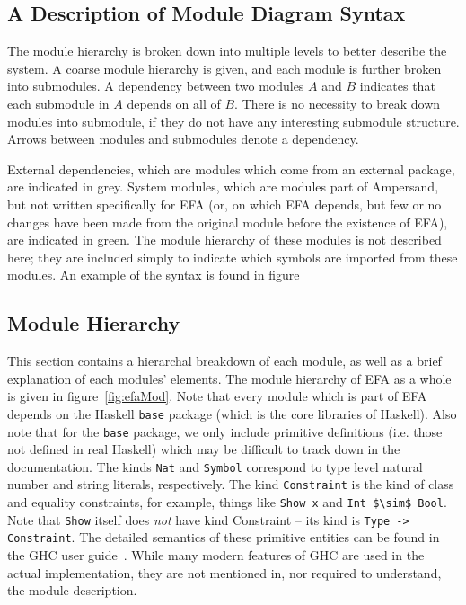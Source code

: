 \subsection{A Description of Module Diagram Syntax}\label{subsec:ModuleSyntax}

The module hierarchy is broken down into multiple levels to better describe the
system.  A coarse module hierarchy is given, and each module is further broken
into submodules.  A dependency between two modules $A$ and $B$ indicates that
each submodule in $A$ depends on all of $B$. There is no necessity to break
down modules into submodule, if they do not have any interesting submodule 
structure. Arrows between modules and submodules denote a dependency. 

External dependencies, which are modules which come from an external package,
are indicated in {\color{grey}grey}. System modules, which are modules part of
Ampersand, but not written specifically for EFA (or, on which EFA depends, but
few or no changes have been made from the original module before the existence
of EFA), are indicated in {\color{applegreen}green}. The module hierarchy of
these modules is not described here; they are included simply to indicate which
symbols are imported from these modules. An example of the syntax is found in
figure%

\subsection{Module Hierarchy}\label{subsec:modhierarchy}

This section contains a hierarchal breakdown of each module, as well as a brief
explanation of each modules' elements. The module hierarchy of EFA as a whole 
is 
given in figure~\ref{fig:efaMod}.  Note
that every module which is part of EFA depends on the Haskell \texttt{base} 
package
(which is the core libraries of Haskell). Also note that for the \texttt{base}
package, we only include primitive definitions (i.e. those not defined in real
Haskell) which may be difficult to track down in the documentation. The kinds
\lstinline{Nat} and \lstinline{Symbol} correspond to type level natural number 
and string
literals, respectively. The kind \lstinline{Constraint} is the kind of class and
equality constraints, for example, things like \lstinline{Show x} and 
\lstinline[mathescape]|Int $\sim$ Bool|.  
Note that \texttt{Show} itself does \emph{not} have kind Constraint --
its kind is \lstinline{Type -> Constraint}. The detailed semantics of these
primitive entities can be found in the GHC user guide~\cite{ghcUserGuide}. While
many modern features of GHC are used in the actual implementation, they are not
mentioned in, nor required to understand, the module description.

